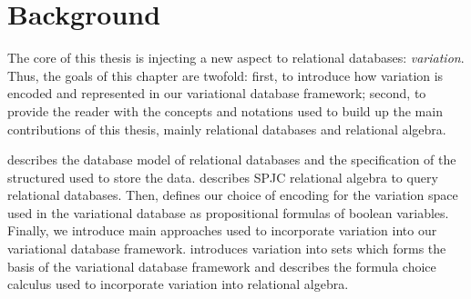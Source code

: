 \chapter{Background}
\label{ch:bg}

The core of this thesis is injecting a new aspect to relational databases: \emph{variation}.
Thus, the goals of this chapter are twofold: 
%
first, to introduce how variation is encoded and represented in our variational database framework;
%
second, to provide the reader with the concepts and notations
used to build up the main contributions of this thesis, mainly relational databases and
relational algebra.
%

%
 describes the database model of relational databases and the specification of
the structured used to store the data.  describes SPJC relational algebra to query
relational databases. 
%
Then, 
 defines our choice of encoding for the variation space used in the 
variational database as propositional formulas of boolean variables.
%
Finally, we introduce main approaches used to incorporate variation into our variational 
database framework.
 introduces variation into sets which forms the basis of the variational database
framework and  describes the formula choice calculus used to incorporate 
variation into relational algebra.



%




